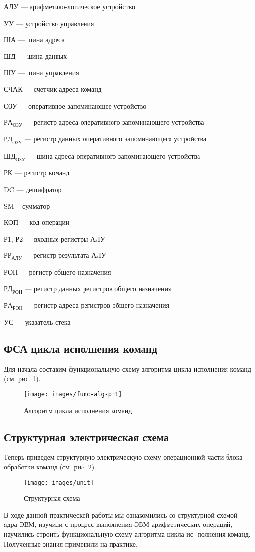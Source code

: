 \documentclass[a4paper,14pt]{extarticle}
\begin{document}
АЛУ --- арифметико-логическое устройство

УУ --- устройство управления

ША --- шина адреса

ШД --- шина данных

ШУ --- шина управления

СЧАК --- счетчик адреса команд

ОЗУ  --- оперативное запоминающее устройство

$РА_{ОЗУ}$ --- регистр адреса оперативного запоминающего устройства

$РД_{ОЗУ}$ --- регистр данных оперативного запоминающего устройства

$ШД_{ОЗУ}$ --- шина адреса оперативного запоминающего устройства

РК  --- регистр команд


DC  --- дешифратор

SM -- сумматор

КОП --- код операции

Р1, Р2 --- входные регистры АЛУ

$РР_{АЛУ}$ --- регистр результата АЛУ

РОН --- регистр общего назначения


$РД_{РОН}$  --- регистр данных регистров общего назначения

$РА_{РОН}$  --- регистр адреса регистров общего назначения

УС --- указатель стека


\subsection{ФСА цикла исполнения команд}

Для начала составим функциональную схему алгоритма цикла исполнения команд (см. рис. \ref{fig:func-alg}).


\begin{figure}[htbp]
	\centering
	\texttt{[image: images/func-alg-pr1]}
	\caption{Алгоритм цикла исполнения команд}
	\label{fig:func-alg}
\end{figure}
\newpage

\subsection{Структурная электрическая схема}
Теперь приведем структурную электрическую схему операционной части блока обработки команд (см. риc. \ref{fig:unit}).
\begin{figure}[htpb]
	\centering
	\texttt{[image: images/unit]}
	\caption{Структурная схема}
	\label{fig:unit}
\end{figure}


В ходе данной практической работы мы ознакомились со структурной
схемой ядра ЭВМ, изучили с процесс выполнения ЭВМ арифметических
операций, научились строить функциональную схему алгоритма цикла ис-
полнения команд. Полученные знания применили на практике.
\end{document}
